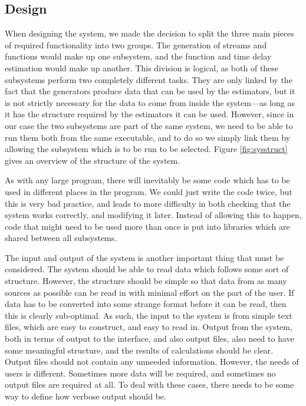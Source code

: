 \documentclass[a4paper,11pt]{article}
\begin{document}
\subsection{Design}
\label{sec-3-1}

   When designing the system, we made the decision to split the three main
   pieces of required functionality into two groups. The generation of streams
   and functions would make up one subsystem, and the function and time delay
   estimation would make up another. This division is logical, as both of these
   subsystems perform two completely different tasks. They are only linked by
   the fact that the generators produce data that can be used by the estimators,
   but it is not strictly necessary for the data to come from inside the
   system---as long as it has the structure required by the estimators it can be
   used. However, since in our case the two subsystems are part of the same
   system, we need to be able to run them both from the same executable, and to
   do so we simply link them by allowing the subsystem which is to be run to be
   selected. Figure \ref{fig:sysstruct} gives an overview of the structure of
   the system.

   As with any large program, there will inevitably be some code which has to be
   used in different places in the program. We could just write the code twice,
   but this is very bad practice, and leads to more difficulty in both checking
   that the system works correctly, and modifying it later. Instead of allowing
   this to happen, code that might need to be used more than once is put into
   libraries which are shared between all subsystems.

   The input and output of the system is another important thing that must be
   considered. The system should be able to read data which follows some sort of
   structure. However, the structure should be simple so that data from as many
   sources as possible can be read in with minimal effort on the part of the
   user. If data has to be converted into some strange format before it can be
   read, then this is clearly sub-optimal. As such, the input to the system is
   from simple text files, which are easy to construct, and easy to read
   in. Output from the system, both in terms of output to the interface, and
   also output files, also need to have some meaningful structure, and the
   results of calculations should be clear. Output files should not contain any
   unneeded information. However, the needs of users is different. Sometimes
   more data will be required, and sometimes no output files are required at
   all. To deal with these cases, there needs to be some way to define how
   verbose output should be.
\end{document}
